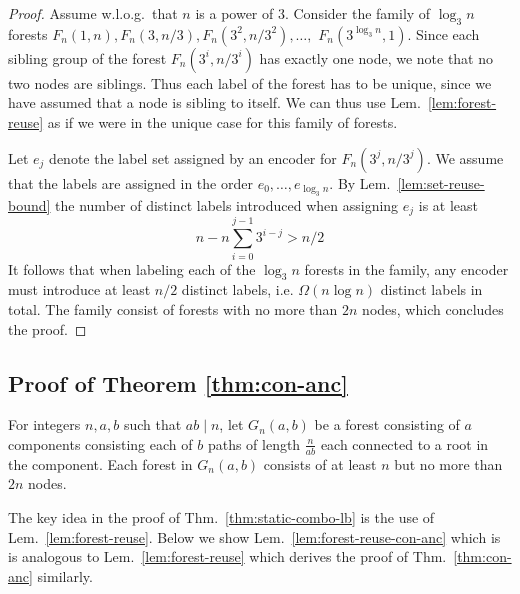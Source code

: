 \documentclass{llncs}
\begin{document}
\begin{proof}
    Assume w.l.o.g.~that $n$ is a power of $3$.
    Consider the family of $\log_3 n$ forests $F_n(1,n), F_n(3,n/3),
    F_n(3^2,n/3^2), \ldots,$ $F_n(3^{\log_3 n}, 1)$. Since each sibling group of
    the forest $F_n(3^i,n/3^i)$ has exactly one node, we note that no two
    nodes are siblings. Thus each label of the forest has to be unique, since
    we have assumed that a node is sibling to itself. We can thus use
    Lem.~\ref{lem:forest-reuse} as if we were in the unique case for this
    family of forests.

    Let $e_j$ denote the label set assigned by an encoder for
    $F_n(3^j,n/3^j)$. We  assume that the labels are assigned in the order
    $e_0,\ldots,e_{\log_3 n}$. By Lem.~\ref{lem:set-reuse-bound} the number of
    distinct labels introduced when assigning $e_j$ is at least
    \[
        n - n\sum_{i=0}^{j-1} 3^{i-j} > n/2
    \]
    It follows that when labeling each of the $\log_3 n$ forests in the family,
    any encoder must introduce at least $n/2$ distinct labels, i.e. $\Omega(n\log n)$
    distinct labels in total.
    The family consist of forests with no more than $2n$ nodes, which
    concludes the proof.
\end{proof}


\subsection{Proof of Theorem \ref{thm:con-anc}} \label{proof:con-anc}

For integers $n,a,b$ such that $ab \mid n$, let $G_n(a,b)$ be  a forest
consisting of $a$ components consisting each  of $b$ paths of length
$\frac{n}{ab}$ each connected to a root in the component. Each forest in $G_n(a,b)$ consists of at least
$n$ but no more than $2n$ nodes.

The key idea in the proof of Thm.~\ref{thm:static-combo-lb} is the use of
Lem.~\ref{lem:forest-reuse}. Below we show  Lem.~\ref{lem:forest-reuse-con-anc}
which is is analogous to Lem.~\ref{lem:forest-reuse} which derives the proof of  Thm.~\ref{thm:con-anc} similarly.
\end{document}
